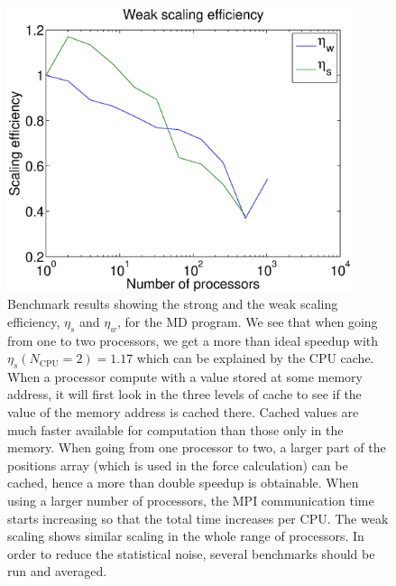 \begin{figure}[htb]
\begin{center}
\includegraphics[width=0.9\textwidth, trim=0cm 0cm 0cm 0cm, clip]{MD/figures/scaling.eps}
\end{center}
\caption{Benchmark results showing the strong and the weak scaling efficiency, $\eta_s$ and $\eta_w$, for the MD program. We see that when going from one to two processors, we get a more than ideal speedup with $\eta_s(N_\text{CPU}=2)=1.17$ which can be explained by the CPU cache. When a processor compute with a value stored at some memory address, it will first look in the three levels of cache to see if the value of the memory address is cached there. Cached values are much faster available for computation than those only in the memory. When going from one processor to two, a larger part of the positions array (which is used in the force calculation) can be cached, hence a more than double speedup is obtainable. When using a larger number of processors, the MPI communication time starts increasing so that the total time increases per CPU. The weak scaling shows similar scaling in the whole range of processors. In order to reduce the statistical noise, several benchmarks should be run and averaged.}
\label{fig:md_strong_scaling}
\end{figure}

